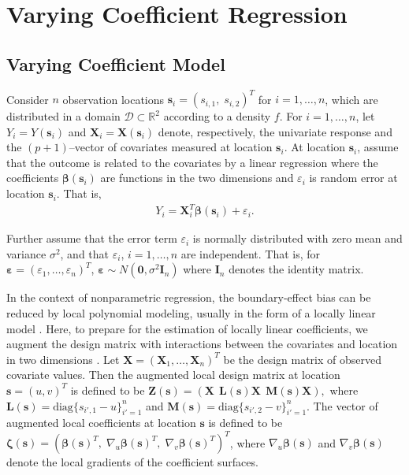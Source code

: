 \documentclass[authoryear,review, 12pt]{elsarticle}
\begin{document}
\section{Varying Coefficient Regression\label{sec:vcr}}

\subsection{Varying Coefficient Model}

Consider $n$ observation locations $\bm{s}_{i}=(s_{i,1},\; s_{i,2})^{T}$
for $i=1,\dots,n$, which are distributed in a domain $\mathcal{D}\subset\mathbb{R}^{2}$
according to a density $f$. For $i=1,\dots,n$, let $Y_{i}=Y(\bm{s}_{i})$
and $\bm{X}_{i}=\bm{X}(\bm{s}_{i})$ denote, respectively, the univariate
response and the $(p+1)$--vector of covariates measured at location
$\bm{s}_{i}$. At location $\bm{s}_{i}$, assume that the outcome
is related to the covariates by a linear regression where the coefficients
$\bm{\beta}(\bm{s}_{i})$ are functions in the two dimensions and
$\varepsilon_{i}$ is random error at location $\bm{s}_{i}$. That
is, 
\begin{align}
Y_{i}=\bm{X}_{i}^{T}\bm{\beta}(\bm{s}_{i})+\varepsilon_{i}.\label{eq:lm(s)}
\end{align}

Further assume that the error term $\varepsilon_{i}$ is normally
distributed with zero mean and variance $\sigma^{2}$, and that $\varepsilon_{i}$,
$i=1,\dots,n$ are independent. That is, for $\bm{\varepsilon}=\left(\varepsilon_{1},\dots,\varepsilon_{n}\right)^{T}$,
$\bm{\varepsilon}\sim N\left(\bm{0},\sigma^{2}\bm{I}_{n}\right)$
where $\bm{I}_{n}$ denotes the identity matrix. 

In the context of nonparametric regression, the boundary-effect bias
can be reduced by local polynomial modeling, usually in the form of
a locally linear model \citep{Fan-Gijbels-1996}. Here, to prepare
for the estimation of locally linear coefficients, we augment the
design matrix with interactions between the covariates and location in two dimensions
\citep{Wang-2008b}. Let $\bm{X}=\left(\bm{X}_{1},\dots,\bm{X}_{n}\right)^{T}$
be the design matrix of observed covariate values. Then the augmented
local design matrix at location $\bm{s} = (u, v)^T$ is defined to be $\bm{Z}(\bm{s})=\left(\bm{X}\ \:\bm{L}(\bm{s}) \bm{X}\ \:\bm{M}(\bm{s}) \bm{X}\right),$
where $\bm{L}(\bm{s})=\text{diag}\{s_{i',1}-u\}_{i'=1}^{n}$ and
$\bm{M}(\bm{s})=\text{diag}\{s_{i',2}-v\}_{i'=1}^{n}$. 
The vector of augmented local coefficients at location $\bm{s}$ is defined to be $\bm{\zeta}(\bm{s})=\left(\bm{\beta}(\bm{s})^{T},\;\nabla_{u}\bm{\beta}(\bm{s})^{T},\;\nabla_{v}\bm{\beta}(\bm{s})^{T}\right)^{T}$,
where $\nabla_{u}\bm{\beta}(\bm{s})$ and $\nabla_{v}\bm{\beta}(\bm{s})$ denote the local gradients 
of the coefficient surfaces.
\end{document}
